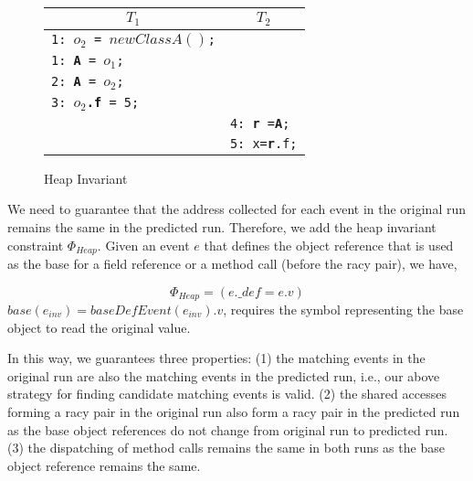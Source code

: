 \begin{figure}
\centering
\begin{tabular}{ll}
\hline
\multicolumn{1}{c}{$T_1$} & \multicolumn{1}{c}{$T_2$} \\
\hline
{\tt 1: {\bf $o_2$} = $new ClassA()$;} & \\
{\tt 1: {\bf A} = $o_1$;} & \\
{\tt 2: {\bf A} = $o_2$;} & \\
{\tt 3: {\bf $o_2$.f} = 5;} & \\
& {\tt 4: {\bf r} ={\bf A}; } \\
& {\tt 5: x={\bf r}.f;} \\	
\end{tabular}
\caption{Heap Invariant}
\label{fig:heapinv}
\end{figure}


We need to guarantee that the address collected for each event in the original run remains the same in the predicted run. 
Therefore, we add the heap invariant constraint $\Phi_{Heap}$.
Given an event $e$ that defines the object reference that is used as the base for a field reference or a method call (before the racy pair), we have,


$$
\Phi_{Heap}=(e.\_def=e.v)
$$
$base(e_{inv})=baseDefEvent(e_{inv}).v$, requires the symbol representing the base object to read the original value. 




In this way, we guarantees three properties: (1) the matching events in the original run are also the matching events in the predicted run, i.e., our above strategy for finding candidate matching events is valid. (2) the shared accesses forming a racy pair in the original run also form a racy pair in the predicted run as the base object references do not change from original run to predicted run.   (3) the dispatching of method calls remains the same in both runs as the base object reference remains the same. 


